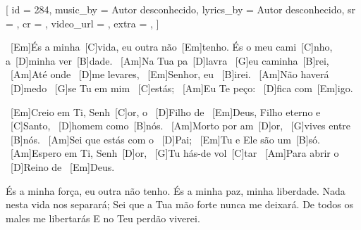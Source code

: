 [
    id          = {284},
    music_by    = {Autor desconhecido},
    lyrics_by   = {Autor desconhecido},
    sr          = {},
    cr          = {},
    video_url   = {},
    extra       = {},
]

\beginverse
\ [Em]És a minha\ [C]vida, eu outra não\ [Em]tenho. 
És o meu cami\ [C]nho, a\ [D]minha ver\ [B]dade.
\ [Am]Na Tua pa\ [D]lavra \ [G]eu caminha\ [B]rei,
\ [Am]Até onde \ [D]me levares, \ [Em]Senhor, eu \ [B]irei.
\ [Am]Não haverá \ [D]medo \ [G]se Tu em mim \ [C]estás; 
\ [Am]Eu Te peço: \ [D]fica com\ [Em]igo. 
\endverse

\beginverse
\ [Em]Creio em Ti, Senh\ [C]or, o \ [D]Filho de \ [Em]Deus, 
Filho eterno e \ [C]Santo, \ [D]homem como\ [B]nós. 
\ [Am]Morto por am\ [D]or, \ [G]vives entre \ [B]nós. 
\ [Am]Sei que estás com o \ [D]Pai; \ [Em]Tu e Ele são um\ [B]só. 
\ [Am]Espero em Ti, Senh\ [D]or, \ [G]Tu hás-de vol\ [C]tar 
\ [Am]Para abrir o \ [D]Reino de \ [Em]Deus. 
\endverse

\beginverse
És a minha força, eu outra não tenho. 
És a minha paz, minha liberdade. 
Nada nesta vida nos separará; 
Sei que a Tua mão forte nunca me deixará. 
De todos os males me libertarás 
E no Teu perdão viverei.
\endverse

\endsong
